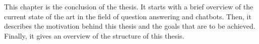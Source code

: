 This chapter is the conclusion of the thesis. It starts with a brief overview of the current state of the art in the field of question answering and chatbots. Then, it describes the motivation behind this thesis and the goals that are to be achieved. Finally, it gives an overview of the structure of this thesis.